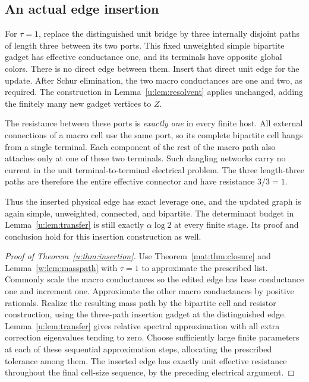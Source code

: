 \subsection{An actual edge insertion}
For $\tau=1$, replace the distinguished unit bridge by three internally
disjoint paths of length three between its two ports. This fixed
unweighted simple bipartite gadget has effective conductance one,
and its terminals have opposite global colors. There is no direct
edge between them. Insert that direct unit edge for the update.
After Schur elimination, the two macro conductances are one and two,
as required. The construction in Lemma~\ref{u:lem:resolvent} applies
unchanged, adding the finitely many new gadget vertices to $Z$.

The resistance between these ports is \emph{exactly one} in every
finite host. All external connections of a macro cell use the same
port, so its complete bipartite cell hangs from a single terminal.
Each component of the rest of the macro path also attaches only at
one of these two terminals. Such dangling networks carry no current
in the unit terminal-to-terminal electrical problem. The three
length-three paths are therefore the entire effective connector and
have resistance $3/3=1$.

Thus the inserted physical edge has exact leverage one, and the
updated graph is again simple, unweighted, connected, and bipartite.
The determinant budget in Lemma~\ref{u:lem:transfer} is still exactly
$\alpha\log2$ at every finite stage. Its proof and conclusion hold
for this insertion construction as well.

\begin{proof}[Proof of Theorem~\ref{u:thm:insertion}]
Use Theorem~\ref{mat:thm:closure} and Lemma~\ref{w:lem:masspath}
with $\tau=1$ to approximate the prescribed list. Commonly scale the macro conductances so the edited
edge has base conductance one and increment one. Approximate the
other macro conductances by positive rationals. Realize the resulting
mass path by the bipartite cell and resistor construction, using the
three-path insertion gadget at the distinguished edge.
Lemma~\ref{u:lem:transfer} gives relative spectral approximation with
all extra correction eigenvalues tending to zero. Choose sufficiently
large finite parameters at each of these sequential approximation
steps, allocating the prescribed tolerance among them. The inserted
edge has exactly unit effective resistance throughout the final
cell-size sequence, by the preceding electrical argument.
\end{proof}

